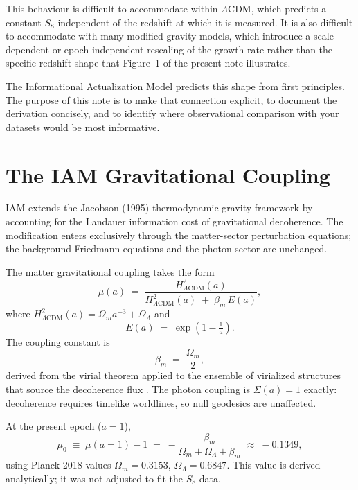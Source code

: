 \documentclass[12pt,a4paper]{article}
\begin{document}
This behaviour is difficult to accommodate within $\Lambda$CDM, which predicts
a constant $S_8$ independent of the redshift at which it is measured.
It is also difficult to accommodate with many modified-gravity models, which
introduce a scale-dependent or epoch-independent rescaling of the growth rate
rather than the specific redshift shape that Figure~1 of the present note
illustrates.

The Informational Actualization Model \citep{Mahaffey2026a} predicts this shape
from first principles.  The purpose of this note is to make that connection
explicit, to document the derivation concisely, and to identify where
observational comparison with your datasets would be most informative.

\section{The IAM Gravitational Coupling}

IAM extends the Jacobson (1995) thermodynamic gravity framework
\citep{Jacobson1995} by accounting for the Landauer information cost
\citep{Landauer1961} of gravitational decoherence.
The modification enters exclusively through the matter-sector perturbation
equations; the background Friedmann equations and the photon sector are
unchanged.

The matter gravitational coupling takes the form
\begin{equation}
  \mu(a) \;=\;
  \frac{H^2_{\Lambda\mathrm{CDM}}(a)}
       {H^2_{\Lambda\mathrm{CDM}}(a) \;+\; \beta_m\, E(a)},
  \label{eq:mu}
\end{equation}
where $H^2_{\Lambda\mathrm{CDM}}(a) = \Omega_m a^{-3} + \Omega_\Lambda$ and
\begin{equation}
  E(a) \;=\; \exp\!\left(1 - \tfrac{1}{a}\right).
  \label{eq:Ea}
\end{equation}
The coupling constant is
\begin{equation}
  \beta_m \;=\; \frac{\Omega_m}{2},
  \label{eq:beta}
\end{equation}
derived from the virial theorem applied to the ensemble of virialized
structures that source the decoherence flux \citep{Mahaffey2026a}.
The photon coupling is $\Sigma(a) = 1$ exactly: decoherence requires
timelike worldlines, so null geodesics are unaffected.

At the present epoch ($a = 1$),
\begin{equation}
  \mu_0 \;\equiv\; \mu(a=1) - 1
  \;=\; -\frac{\beta_m}{\Omega_m + \Omega_\Lambda + \beta_m}
  \;\approx\; -0.1349,
  \label{eq:mu0}
\end{equation}
using Planck 2018 values $\Omega_m = 0.3153$, $\Omega_\Lambda = 0.6847$.
This value is derived analytically; it was not adjusted to fit the $S_8$ data.
\end{document}
